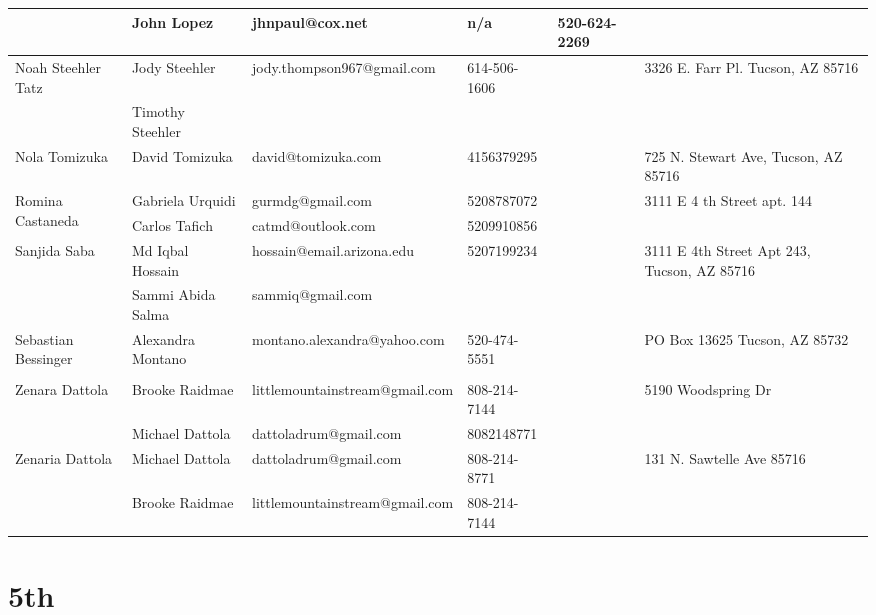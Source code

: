 \documentclass[landscape]{article}\usepackage[]{graphicx}\usepackage[]{color}
\begin{document}
\begin{longtable}{|p{100pt}|p{100pt}|p{140pt}|p{60pt}|p{64pt}|p{120pt}|}
 & John Lopez & jhnpaul@cox.net & n/a & 520-624-2269 & \\
\hline
\multirow{2}{100pt}{Noah Steehler Tatz} & Jody Steehler & jody.thompson967@gmail.com & 614-506-1606 &  & \multirow{2}{120pt}{3326 E. Farr Pl. Tucson, AZ 85716} \\
 & Timothy Steehler &  &  &  & \\
\hline
\multirow{2}{100pt}{Nola Tomizuka} & David Tomizuka & david@tomizuka.com & 4156379295 &  & \multirow{2}{120pt}{725 N. Stewart Ave, Tucson, AZ 85716} \\
 &  &  &  &  & \\
\hline
\multirow{2}{100pt}{Romina Castaneda} & Gabriela Urquidi & gurmdg@gmail.com & 5208787072 &  & \multirow{2}{120pt}{3111 E 4 th Street apt. 144} \\
 & Carlos Tafich & catmd@outlook.com & 5209910856 &  & \\
\hline
\multirow{2}{100pt}{Sanjida Saba} & Md Iqbal Hossain & hossain@email.arizona.edu & 5207199234 &  & \multirow{2}{120pt}{3111 E 4th Street Apt 243, Tucson, AZ 85716} \\
 & Sammi Abida Salma & sammiq@gmail.com &  &  & \\
\hline
\multirow{2}{100pt}{Sebastian Bessinger} & Alexandra Montano & montano.alexandra@yahoo.com & 520-474-5551 &  & \multirow{2}{120pt}{PO Box 13625 Tucson, AZ 85732} \\
 &  &  &  &  & \\
\hline
\multirow{2}{100pt}{Zenara Dattola} & Brooke Raidmae & littlemountainstream@gmail.com & 808-214-7144 &  & \multirow{2}{120pt}{5190 Woodspring Dr} \\
 & Michael Dattola & dattoladrum@gmail.com & 8082148771 &  & \\
\hline
\multirow{2}{100pt}{Zenaria Dattola} & Michael Dattola & dattoladrum@gmail.com & 808-214-8771 &  & \multirow{2}{120pt}{131 N. Sawtelle Ave 85716} \\
 & Brooke Raidmae & littlemountainstream@gmail.com & 808-214-7144 &  & \\
\hline
\end{longtable}
\newpage
\section{5th}
\end{document}
